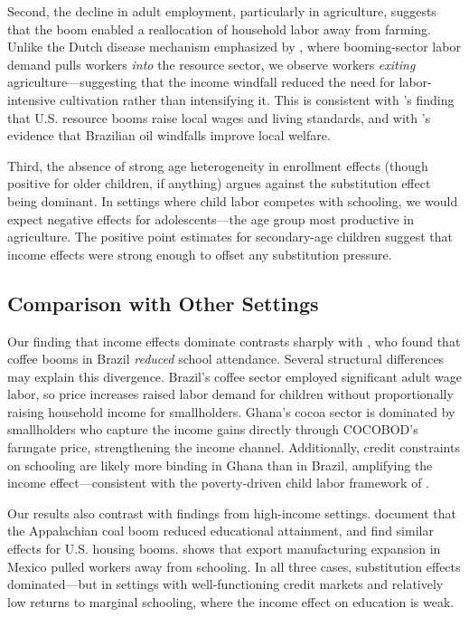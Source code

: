\documentclass[12pt]{article}
\begin{document}
Second, the decline in adult employment, particularly in agriculture, suggests that the boom enabled a reallocation of household labor away from farming. Unlike the Dutch disease mechanism emphasized by \citet{corden1982}, where booming-sector labor demand pulls workers \textit{into} the resource sector, we observe workers \textit{exiting} agriculture---suggesting that the income windfall reduced the need for labor-intensive cultivation rather than intensifying it. This is consistent with \citet{allcott2018}'s finding that U.S. resource booms raise local wages and living standards, and with \citet{aragoncaselli2013}'s evidence that Brazilian oil windfalls improve local welfare.

Third, the absence of strong age heterogeneity in enrollment effects (though positive for older children, if anything) argues against the substitution effect being dominant. In settings where child labor competes with schooling, we would expect negative effects for adolescents---the age group most productive in agriculture. The positive point estimates for secondary-age children suggest that income effects were strong enough to offset any substitution pressure.

\subsection{Comparison with Other Settings}

Our finding that income effects dominate contrasts sharply with \citet{kruger2007}, who found that coffee booms in Brazil \textit{reduced} school attendance. Several structural differences may explain this divergence. Brazil's coffee sector employed significant adult wage labor, so price increases raised labor demand for children without proportionally raising household income for smallholders. Ghana's cocoa sector is dominated by smallholders who capture the income gains directly through COCOBOD's farmgate price, strengthening the income channel. Additionally, credit constraints on schooling are likely more binding in Ghana than in Brazil, amplifying the income effect---consistent with the poverty-driven child labor framework of \citet{basu1998}.

Our results also contrast with findings from high-income settings. \citet{black2005} document that the Appalachian coal boom reduced educational attainment, and \citet{charles2018} find similar effects for U.S. housing booms. \citet{atkin2016} shows that export manufacturing expansion in Mexico pulled workers away from schooling. In all three cases, substitution effects dominated---but in settings with well-functioning credit markets and relatively low returns to marginal schooling, where the income effect on education is weak.
\end{document}
